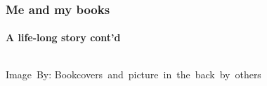 \begin{frame}
	\frametitle{Me and my books}
	\framesubtitle{A life-long story cont'd}

	\begin{columns}
			\begin{center}
				\hspace*{15pt}\hbox{\scriptsize Image By:}
				\hspace*{15pt}\hbox{\scriptsize Bookcovers and picture in the back by others}

\end{center}
\end{columns}
\end{frame}
